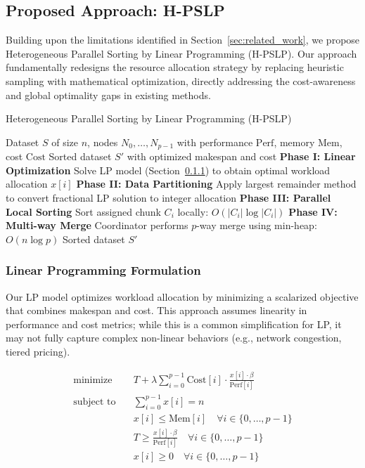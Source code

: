 \documentclass[]{interact}
\theoremstyle{plain}
\theoremstyle{definition}
\theoremstyle{remark}
\begin{document}
\subsection{Proposed Approach: H-PSLP}
\label{sec:proposed}

Building upon the limitations identified in Section~\ref{sec:related_work}, we propose Heterogeneous Parallel Sorting by Linear Programming (H-PSLP). Our approach fundamentally redesigns the resource allocation strategy by replacing heuristic sampling with mathematical optimization, directly addressing the cost-awareness and global optimality gaps in existing methods.

\begin{algorithm}
\caption{Heterogeneous Parallel Sorting by Linear Programming (H-PSLP)}
\label{alg:hpslp}
\begin{algorithmic}[1]
\REQUIRE Dataset $S$ of size $n$, nodes $N_0, \dots, N_{p-1}$ with performance $\text{Perf}$, memory $\text{Mem}$, cost $\text{Cost}$
\ENSURE Sorted dataset $S'$ with optimized makespan and cost
\STATE \textbf{Phase I: Linear Optimization}
\STATE Solve LP model (Section~\ref{sec:lp_formulation}) to obtain optimal workload allocation $x[i]$
\STATE
\STATE \textbf{Phase II: Data Partitioning}
\STATE Apply largest remainder method to convert fractional LP solution to integer allocation
\STATE
\STATE \textbf{Phase III: Parallel Local Sorting}
    \STATE Sort assigned chunk $C_i$ locally: $O(|C_i| \log |C_i|)$
\ENDFOR
\STATE
\STATE \textbf{Phase IV: Multi-way Merge}
\STATE Coordinator performs $p$-way merge using min-heap: $O(n \log p)$
\RETURN Sorted dataset $S'$
\end{algorithmic}
\end{algorithm}

\subsubsection{Linear Programming Formulation}
\label{sec:lp_formulation}

Our LP model optimizes workload allocation by minimizing a scalarized objective that combines makespan and cost. This approach assumes linearity in performance and cost metrics; while this is a common simplification for LP, it may not fully capture complex non-linear behaviors (e.g., network congestion, tiered pricing).

\begin{align}
\text{minimize} \quad & T + \lambda \sum_{i=0}^{p-1} \text{Cost}[i] \cdot \frac{x[i] \cdot \beta}{\text{Perf}[i]} \label{eq:objective}\\
\text{subject to} \quad & \sum_{i=0}^{p-1} x[i] = n \label{eq:workload_constraint}\\
& x[i] \leq \text{Mem}[i] \quad \forall i \in \{0, \ldots, p-1\} \label{eq:memory_constraint}\\
& T \geq \frac{x[i] \cdot \beta}{\text{Perf}[i]} \quad \forall i \in \{0, \ldots, p-1\} \label{eq:makespan_constraint}\\
& x[i] \geq 0 \quad \forall i \in \{0, \ldots, p-1\} \label{eq:non_negative}
\end{align}
\end{document}
